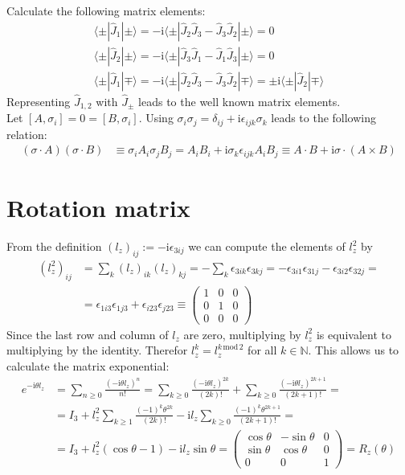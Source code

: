 \documentclass[english, parskip=full]{scrartcl}
\newcommand{\braket}{}
\newcommand{\klam}{}
\newcommand{\tecxt}{}
\def\I{\text{i}}
\begin{document}
Calculate the following matrix elements:
\begin{align*}
\braket\langle {\pm} | {\hat{J}_1} | {\pm}\rangle=-\I\braket\langle {\pm} | {\hat{J}_2\hat{J}_3-\hat{J}_3\hat{J}_2} | {\pm}\rangle=0\\
\braket\langle {\pm} | {\hat{J}_2} | {\pm}\rangle=-\I\braket\langle {\pm} | {\hat{J}_3\hat{J}_1-\hat{J}_1\hat{J}_3} | {\pm}\rangle=0\\
\braket\langle {\pm} | {\hat{J}_1} | {\mp}\rangle=-\I\braket\langle {\pm} | {\hat{J}_2\hat{J}_3-\hat{J}_3\hat{J}_2} | {\mp}\rangle=\pm\I\braket\langle {\pm} | {\hat{J}_2} | {\mp}\rangle
\end{align*}
Representing $\hat{J}_{1,2}$ with $\hat{J}_\pm$ leads to the well known matrix elements.\\
Let $\klam\left[ {A,\sigma_i} \right]=0=\klam\left[ {B,\sigma_i} \right]$. Using $\sigma_i\sigma_j=\delta_{ij}+\I\epsilon_{ijk}\sigma_k$ leads to the following relation:
\begin{align*}
(\sigma\cdot A)(\sigma\cdot B)&\equiv\sigma_iA_i\sigma_jB_j=A_iB_i+\I\sigma_k\epsilon_{ijk}A_iB_j\equiv A\cdot B+\I\sigma\cdot (A\times B)
\end{align*}
\section{Rotation matrix}
From the definition $(l_z)_{ij}:=-\I\epsilon_{3ij}$ we can compute the elements of $l_z^2$ by 
\begin{align*}
(l_z^2)_{ij}&=\sum_k (l_z)_{ik}(l_z)_{kj}=-\sum_k\epsilon_{3ik}\epsilon_{3kj}=-\epsilon_{3i1}\epsilon_{31j}-\epsilon_{3i2}\epsilon_{32j}=\\
&=\epsilon_{1i3}\epsilon_{1j3}+\epsilon_{i23}\epsilon_{j23}\equiv\begin{pmatrix}
1&0&0\\
0&1&0\\
0&0&0
\end{pmatrix}
\end{align*}
Since the last row and column of $l_z$ are zero, multiplying by $l_z^2$ is equivalent to multiplying by the identity. Therefor $l_z^k=l_z^{k\,\tecxt\text{mod}\,2}$ for all $k\in\mathbb{N}$. This allows us to calculate the matrix exponential:
\begin{align*}
e^{-\I\theta l_z}&=\sum_{n\ge 0}\frac{(-\I\theta l_z)^n}{n!}=\sum_{k\ge 0}\frac{(-\I\theta l_z)^{2k}}{(2k)!}+\sum_{k\ge 0}\frac{(-\I\theta l_z)^{2k+1}}{(2k+1)!}=\\
&=I_3+l_z^2\sum_{k\ge 1}\frac{(-1)^k\theta^{2k}}{(2k)!}-\I l_z\sum_{k\ge 0}\frac{(-1)^k\theta^{2k+1}}{(2k+1)!}=\\
&=I_3 + l_z^2(\cos\theta - 1)-\I l_z\sin\theta=\begin{pmatrix}
\cos\theta&-\sin\theta&0\\
\sin\theta&\cos\theta&0\\
0&0&1
\end{pmatrix}=R_z(\theta)
\end{align*}
\end{document}
